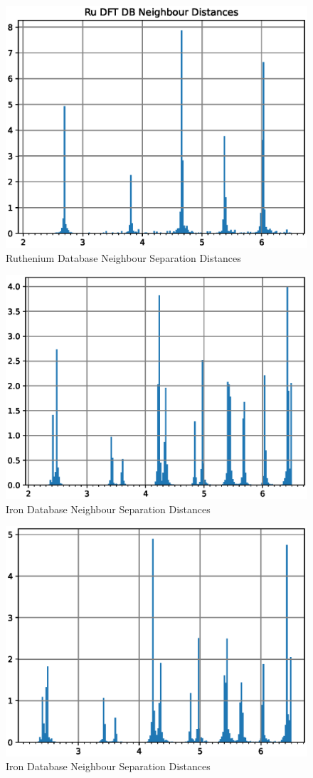 \begin{figure}[htb]
\includegraphics[width=0.5\linewidth]{chapters/results_dft_reference_db/neighbour_distances/db_ru_neighbours.eps}
\caption{Ruthenium Database Neighbour Separation Distances}
\label{fig:shengpdpair}
\end{figure}



\begin{figure}[htb]
\includegraphics[width=0.5\linewidth]{chapters/results_dft_reference_db/neighbour_distances/db_feru_neighbours.eps}
\caption{Iron Database Neighbour Separation Distances}
\label{fig:shengpdpair}
\end{figure}


\begin{figure}[htb]
\includegraphics[width=0.5\linewidth]{chapters/results_dft_reference_db/neighbour_distances/db_fepd_neighbours.eps}
\caption{Iron Database Neighbour Separation Distances}
\label{fig:shengpdpair}
\end{figure}


